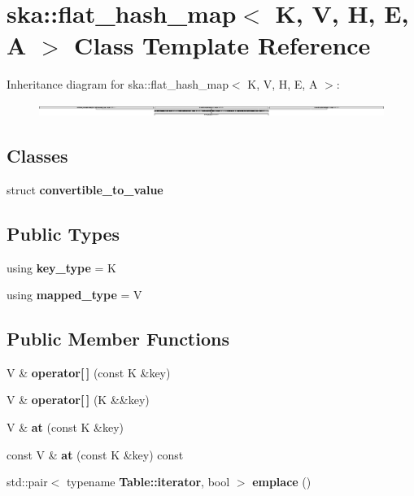 \section{ska\+:\+:flat\+\_\+hash\+\_\+map$<$ K, V, H, E, A $>$ Class Template Reference}
\label{classska_1_1flat__hash__map}
Inheritance diagram for ska\+:\+:flat\+\_\+hash\+\_\+map$<$ K, V, H, E, A $>$\+:\begin{figure}[H]
\begin{center}
\leavevmode
\includegraphics[height=0.345893cm]{classska_1_1flat__hash__map}
\end{center}
\end{figure}
\subsection*{Classes}
\begin{DoxyCompactItemize}
\item 
struct {\bf convertible\+\_\+to\+\_\+value}
\end{DoxyCompactItemize}
\subsection*{Public Types}
\begin{DoxyCompactItemize}
\item 
using {\bfseries key\+\_\+type} = K\label{classska_1_1flat__hash__map_ab22f477e2dfc6e682ee147fcf805e4a9}

\item 
using {\bfseries mapped\+\_\+type} = V\label{classska_1_1flat__hash__map_a1cb3116c3119b43080e0acdfde9a5ddd}

\end{DoxyCompactItemize}
\subsection*{Public Member Functions}
\begin{DoxyCompactItemize}
\item 
V \& {\bfseries operator[$\,$]} (const K \&key)\label{classska_1_1flat__hash__map_ada5db818bc094fba7e76006eeadf4ee9}

\item 
V \& {\bfseries operator[$\,$]} (K \&\&key)\label{classska_1_1flat__hash__map_a0585139dbbb10cf41b68d3968dbf2010}

\item 
V \& {\bfseries at} (const K \&key)\label{classska_1_1flat__hash__map_a374735760ecc82651cbb508a1d8866c1}

\item 
const V \& {\bfseries at} (const K \&key) const \label{classska_1_1flat__hash__map_a6facd6586c9856cbc577368cdb319ff3}

\item 
std\+::pair$<$ typename {\bf Table\+::iterator}, bool $>$ {\bfseries emplace} ()\label{classska_1_1flat__hash__map_a95175e5ecd48bbdb2d7820b833cefbb4}

\end{DoxyCompactItemize}
